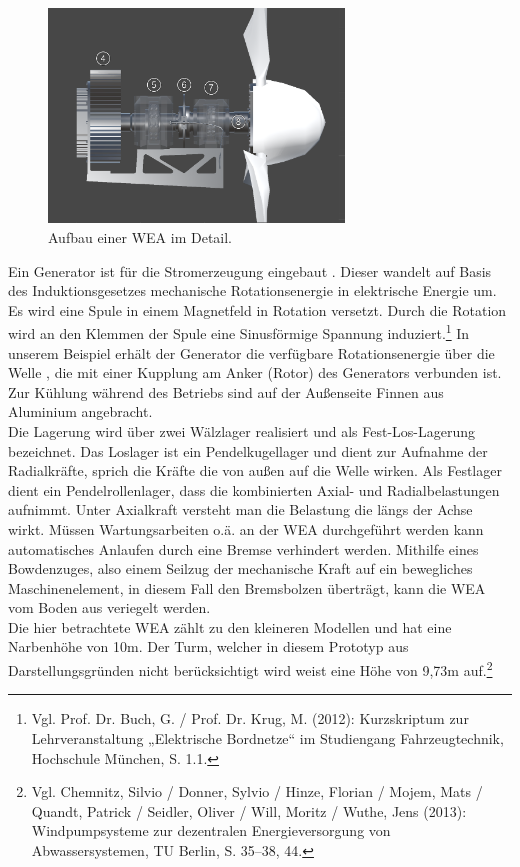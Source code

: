 \begin{figure}[H]
	\centering
	\captionsetup{width=0.7\textwidth}
	\includegraphics[keepaspectratio, width=0.7\textwidth]{bildquellen/WEA2_2}
	\caption{Aufbau einer WEA im Detail.}
	\label{fig:2}
\end{figure}

Ein Generator ist für die Stromerzeugung eingebaut . Dieser wandelt auf Basis des Induktionsgesetzes mechanische Rotationsenergie in elektrische Energie um. Es wird eine Spule in einem Magnetfeld in Rotation versetzt. Durch die Rotation wird an den Klemmen der Spule eine Sinusförmige Spannung induziert.\footnote{Vgl. Prof. Dr. Buch, G. / Prof. Dr. Krug, M.  (2012): Kurzskriptum zur Lehrveranstaltung „Elektrische Bordnetze“ im Studiengang Fahrzeugtechnik, Hochschule München, S. 1.1.} In unserem Beispiel erhält der Generator die verfügbare Rotationsenergie über die Welle , die mit einer Kupplung am Anker (Rotor) des Generators verbunden ist. Zur Kühlung während des Betriebs sind auf der Außenseite Finnen aus Aluminium angebracht.\\
Die Lagerung wird über zwei Wälzlager realisiert und als Fest-Los-Lagerung bezeichnet. Das Loslager ist ein Pendelkugellager  und dient zur Aufnahme der Radialkräfte, sprich die Kräfte die von außen auf die Welle wirken. Als Festlager dient ein Pendelrollenlager,  dass die kombinierten Axial- und Radialbelastungen aufnimmt. Unter Axialkraft versteht man die Belastung die längs der Achse wirkt.
Müssen Wartungsarbeiten o.ä. an der WEA durchgeführt werden kann automatisches Anlaufen durch eine Bremse  verhindert werden. Mithilfe eines Bowdenzuges, also einem Seilzug der mechanische Kraft auf ein bewegliches Maschinenelement, in diesem Fall den Bremsbolzen überträgt, kann die WEA vom Boden aus veriegelt werden. \\
Die hier betrachtete WEA zählt zu den kleineren Modellen und hat eine Narbenhöhe von 10m. Der Turm, welcher in diesem Prototyp aus Darstellungsgründen nicht berücksichtigt wird weist eine Höhe von 9,73m auf.\footnote{Vgl. Chemnitz, Silvio / Donner, Sylvio / Hinze, Florian / Mojem, Mats / Quandt, Patrick / Seidler, Oliver / Will, Moritz / Wuthe, Jens  (2013): Windpumpsysteme zur dezentralen Energieversorgung von Abwassersystemen, TU Berlin, S. 35--38, 44.} 
   


